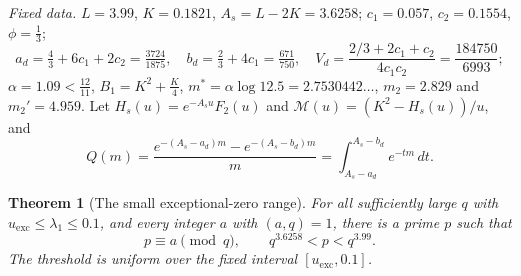 \documentclass[11pt]{amsart}
\numberwithin{equation}{section}
\theoremstyle{plain}
\newtheorem{theorem}{Theorem}[section]
\theoremstyle{definition}
\theoremstyle{remark}
\newcommand{\1}{\mathbf{1}}
\begin{document}
\emph{Fixed data.} $L=3.99$, $K=0.1821$, $A_s=L-2K=3.6258$; $c_1=0.057$, $c_2=0.1554$, $\phi=\frac13$;
\[
  a_d=\tfrac43+6c_1+2c_2=\tfrac{3724}{1875},\quad b_d=\tfrac23+4c_1=\tfrac{671}{750},\quad
  V_d=\frac{2/3+2c_1+c_2}{4c_1c_2}=\frac{184750}{6993};
\]
$\alpha=1.09<\frac{12}{11}$, $B_1=K^2+\frac K4$, $m^*=\alpha\log12.5=2.7530442\ldots$, $m_2=2.829$ and $m_2'=4.959$.
Let $H_s(u)=e^{-A_su}F_2(u)$ and $\mathcal M(u)=(K^2-H_s(u))/u$, and
\[
  Q(m)=\frac{e^{-(A_s-a_d)m}-e^{-(A_s-b_d)m}}m=\int_{A_s-a_d}^{A_s-b_d}e^{-tm}\,dt .
\]

\begin{theorem}[The small exceptional-zero range]\label{thm:small}
For all sufficiently large $q$ with $u_{\mathrm{exc}}\le\lambda_1\le0.1$, and every
integer $a$ with $(a,q)=1$, there is a prime $p$ such that
\[
  p\equiv a\pmod q,\qquad q^{3.6258}<p<q^{3.99}.
\]
The threshold is uniform over the fixed interval $[u_{\mathrm{exc}},0.1]$.
\end{theorem}
\end{document}

